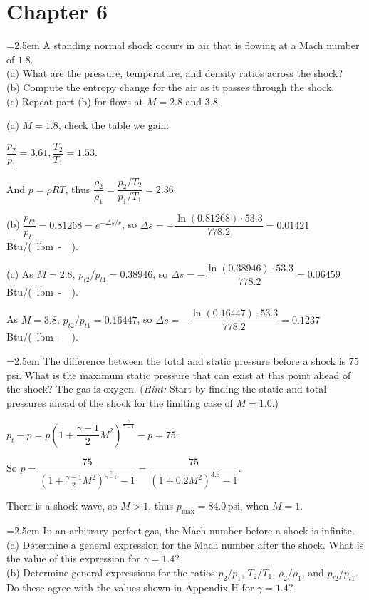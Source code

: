 \documentclass[12pt]{article}
\newlength{\questionlabelwidth}
\newcommand{\question}[2]{%
  \par\noindent
  {\hangindent=2.5em %
   \hangafter=1 %
   \makebox[\questionlabelwidth][l]{\textbf{#1}}#2\par}%
}
\begin{document}
\newpage

\section{Chapter 6}
\question{6.1}{A standing normal shock occurs in air that is flowing at a Mach number of $1.8$.\\
(a)	What are the pressure, temperature, and density ratios across the shock?\\
(b)	Compute the entropy change for the air as it passes through the shock.\\
(c)	Repeat part (b) for flows at $M = 2.8$ and $3.8$.
}

\begin{answerbox}
(a) $M=1.8$, check the table we gain:

$\dfrac{p_2}{p_1}=3.61, \dfrac{T_2}{T_1}=1.53$.

And $p=\rho RT$, thus $\dfrac{\rho_2}{\rho_1}=\dfrac{p_2/T_2}{p_1/T_1}=2.36$.

(b) $\dfrac{p_{t2}}{p_{t1}}=0.81268=e^{-\Delta s/r}$, so $\Delta s=-\dfrac{\ln(0.81268)\cdot 53.3}{778.2}=0.01421$\,\si{Btu/(lbm-\Rankine)}.

(c) As $M=2.8$, $p_{t2}/p_{t1}=0.38946$, so $\Delta s=-\dfrac{\ln(0.38946)\cdot 53.3}{778.2}=0.06459$\,\si{Btu/(lbm-\Rankine)}.

As $M=3.8$, $p_{t2}/p_{t1}=0.16447$, so $\Delta s=-\dfrac{\ln(0.16447)\cdot 53.3}{778.2}=0.1237$\,\si{Btu/(lbm-\Rankine)}.
\end{answerbox}

\question{6.2}{The difference between the total and static pressure before a shock is $75$\,\si{psi}. What is the maximum static pressure that can exist at this point ahead of the shock? The gas is oxygen. (\textit{Hint:} Start by finding the static and total pressures ahead of the shock for the limiting case of $M = 1.0$.)
}

\begin{answerbox}
$p_t-p=p\left(1+\dfrac{\gamma -1}{2}M^2\right)^{\frac{\gamma}{\gamma-1}}-p=75$.

So $p=\dfrac{75}{\left(1+\frac{\gamma-1}{2}M^2\right)^{\frac{\gamma}{\gamma -1}}-1}=\dfrac{75}{\left(1+0.2M^2\right)^{3.5}-1}$.

There is a shock wave, so $M>1$, thus $p_{\max}=84.0$\,\si{psi}, when $M=1$.
\end{answerbox}

\question{6.3}{In an arbitrary perfect gas, the Mach number before a shock is infinite.\\
(a)	Determine a general expression for the Mach number after the shock. What is the value of this expression for $\gamma = 1.4$?\\
(b)	Determine general expressions for the ratios $p_2/p_1$, $T_2/T_1$, $\rho_2/\rho_1$, and $p_{t2}/p_{t1}$. Do these agree with the values shown in Appendix H for $\gamma = 1.4$?
}
\end{document}
